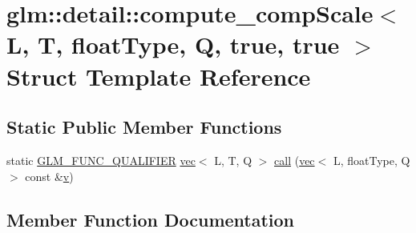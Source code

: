 \hypertarget{structglm_1_1detail_1_1compute__comp_scale_3_01_l_00_01_t_00_01float_type_00_01_q_00_01true_00_01true_01_4}{}\section{glm\+:\+:detail\+:\+:compute\+\_\+comp\+Scale$<$ L, T, float\+Type, Q, true, true $>$ Struct Template Reference}
\label{structglm_1_1detail_1_1compute__comp_scale_3_01_l_00_01_t_00_01float_type_00_01_q_00_01true_00_01true_01_4}
\subsection*{Static Public Member Functions}
\begin{DoxyCompactItemize}
\item 
static \mbox{\hyperlink{setup_8hpp_a33fdea6f91c5f834105f7415e2a64407}{G\+L\+M\+\_\+\+F\+U\+N\+C\+\_\+\+Q\+U\+A\+L\+I\+F\+I\+ER}} \mbox{\hyperlink{structglm_1_1vec}{vec}}$<$ L, T, Q $>$ \mbox{\hyperlink{structglm_1_1detail_1_1compute__comp_scale_3_01_l_00_01_t_00_01float_type_00_01_q_00_01true_00_01true_01_4_a49d34acc164a29cf170f74fb96eaa84d}{call}} (\mbox{\hyperlink{structglm_1_1vec}{vec}}$<$ L, float\+Type, Q $>$ const \&\mbox{\hyperlink{_s_d_l__opengl_8h_a10a82eabcb59d2fcd74acee063775f90}{v}})
\end{DoxyCompactItemize}


\subsection{Member Function Documentation}
\mbox{\label{structglm_1_1detail_1_1compute__comp_scale_3_01_l_00_01_t_00_01float_type_00_01_q_00_01true_00_01true_01_4_a49d34acc164a29cf170f74fb96eaa84d}} 
